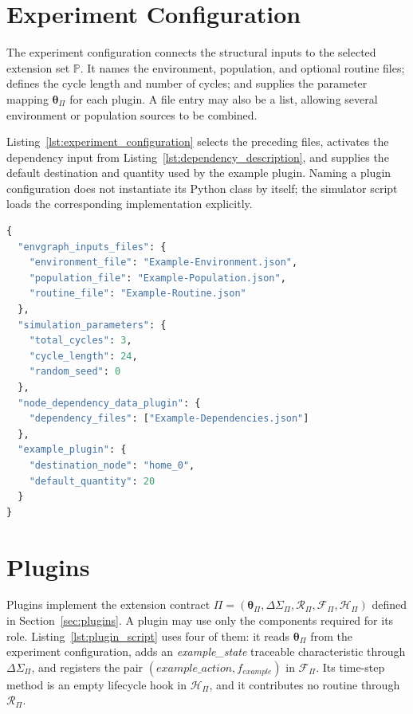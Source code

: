 \section{Experiment Configuration}
\label{app:experiment_configuration}

The experiment configuration connects the structural inputs to the selected
extension set $\mathbb{P}$. It names the environment, population, and optional
routine files; defines the cycle length and number of cycles; and supplies the
parameter mapping $\bm{\theta}_{\Pi}$ for each plugin. A file entry may also be
a list, allowing several environment or population sources to be combined.

Listing~\ref{lst:experiment_configuration} selects the preceding files,
activates the dependency input from
Listing~\ref{lst:dependency_description}, and supplies the default destination
and quantity used by the example plugin. Naming a plugin configuration does
not instantiate its Python class by itself; the simulator script loads the
corresponding implementation explicitly.

\begin{lstlisting}[language={Python},
caption={Example of an experiment configuration file.},
captionpos=b, label={lst:experiment_configuration}, basicstyle=\scriptsize]
{
  "envgraph_inputs_files": {
    "environment_file": "Example-Environment.json",
    "population_file": "Example-Population.json",
    "routine_file": "Example-Routine.json"
  },
  "simulation_parameters": {
    "total_cycles": 3,
    "cycle_length": 24,
    "random_seed": 0
  },
  "node_dependency_data_plugin": {
    "dependency_files": ["Example-Dependencies.json"]
  },
  "example_plugin": {
    "destination_node": "home_0",
    "default_quantity": 20
  }
}
\end{lstlisting}


\section{Plugins}
\label{app:plugin}

Plugins implement the extension contract $\Pi=(\bm{\theta}_{\Pi},
\Delta\Sigma_{\Pi},\mathcal{R}_{\Pi},\mathcal{F}_{\Pi},
\mathcal{H}_{\Pi})$ defined in Section~\ref{sec:plugins}. A plugin may use only
the components required for its role. Listing~\ref{lst:plugin_script} uses
four of them: it reads $\bm{\theta}_{\Pi}$ from the experiment configuration,
adds an \textit{example\_state} traceable characteristic through
$\Delta\Sigma_{\Pi}$, and registers the pair
$(\textit{example\_action},f_{\textit{example}})$ in
$\mathcal{F}_{\Pi}$. Its time-step method is an empty lifecycle hook in
$\mathcal{H}_{\Pi}$, and it contributes no routine through
$\mathcal{R}_{\Pi}$.


